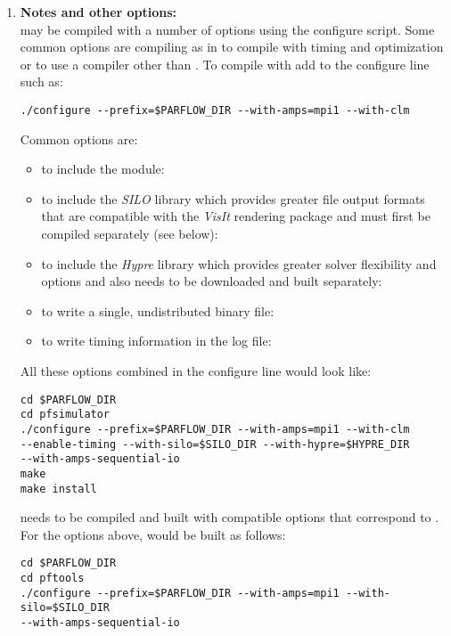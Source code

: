 \begin{enumerate}
\item {\bf Notes and other options:}\\ \parflow{} may be compiled with
 a number of options using the configure script.  Some common options
 are compiling  as in \cite{MM05,KM08a} to compile with
 timing and optimization or to use a compiler other than .
  To compile with  add  to the configure
 line such as:
\begin{display}\begin{verbatim}
./configure --prefix=$PARFLOW_DIR --with-amps=mpi1 --with-clm
\end{verbatim}\end{display}

Common options are:

\begin{itemize}
\item to include the  module:  
\item to include the \emph{SILO} 
library which provides greater file output formats that are compatible
with the \emph{VisIt} rendering package and must first be compiled 
separately (see below): 
\item to include the \emph{Hypre} library which provides greater solver
flexibility and options and also needs to be downloaded and built separately:
\item to write a single, undistributed \parflow{} binary file:
\item to write timing information in the log file: 
\end{itemize}

All these options combined in the configure line would look like:

\begin{display}\begin{verbatim}
cd $PARFLOW_DIR
cd pfsimulator
./configure --prefix=$PARFLOW_DIR --with-amps=mpi1 --with-clm 
--enable-timing --with-silo=$SILO_DIR --with-hypre=$HYPRE_DIR
--with-amps-sequential-io
make 
make install
\end{verbatim}\end{display}

 needs to be compiled and built with compatible options
that correspond to \parflow{}.  For the options above,  would
be built as follows:

\begin{display}\begin{verbatim}
cd $PARFLOW_DIR
cd pftools
./configure --prefix=$PARFLOW_DIR --with-amps=mpi1 --with-silo=$SILO_DIR
--with-amps-sequential-io


\end{verbatim}
\end{display}
\end{enumerate}

